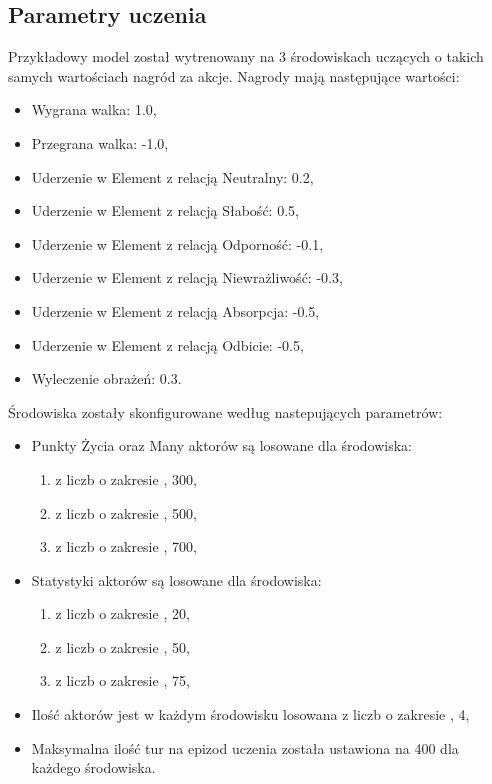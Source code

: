 \documentclass{SGGW-thesis}
\begin{document}
\subsection{Parametry uczenia}
Przykładowy model został wytrenowany na 3 środowiskach uczących o takich samych wartościach nagród za akcje. Nagrody mają następujące wartości:
\begin{itemize}
  \item Wygrana walka: 1.0,
  \item Przegrana walka: -1.0,
  \item Uderzenie w Element z relacją Neutralny: 0.2,
  \item Uderzenie w Element z relacją Słabość: 0.5,
  \item Uderzenie w Element z relacją Odporność: -0.1,
  \item Uderzenie w Element z relacją Niewrażliwość: -0.3,
  \item Uderzenie w Element z relacją Absorpcja: -0.5,
  \item Uderzenie w Element z relacją Odbicie: -0.5,
  \item Wyleczenie obrażeń: 0.3.
\end{itemize}
Środowiska zostały skonfigurowane według nastepujących parametrów:
\begin{itemize}
  \item Punkty Życia oraz Many aktorów są losowane dla środowiska:
  \begin{enumerate}
    \item z liczb o zakresie , 300\textrangle,
    \item z liczb o zakresie , 500\textrangle,
    \item z liczb o zakresie , 700\textrangle,
  \end{enumerate}
  \item Statystyki aktorów są losowane dla środowiska:
  \begin{enumerate}
    \item z liczb o zakresie , 20\textrangle,
    \item z liczb o zakresie , 50\textrangle,
    \item z liczb o zakresie , 75\textrangle,
  \end{enumerate}
  \item Ilość aktorów jest w każdym środowisku losowana z liczb o zakresie , 4\textrangle,
  \item Maksymalna ilość tur na epizod uczenia została ustawiona na 400 dla każdego środowiska.
\end{itemize}
\end{document}
